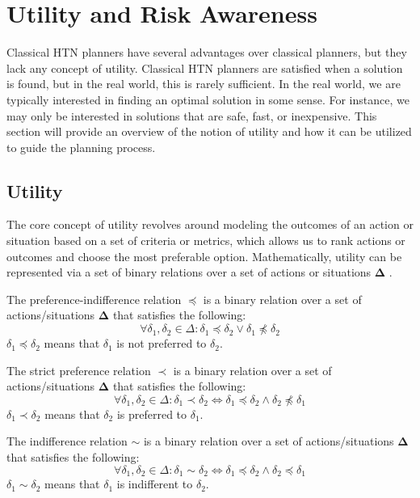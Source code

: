 \section{Utility and Risk Awareness}
\label{sec:utilityAnRisk}

Classical HTN planners have several advantages over classical planners, but they lack any concept of utility. Classical HTN planners are satisfied when a solution is found, but in the real world, this is rarely sufficient. In the real world, we are typically interested in finding an optimal solution in some sense. For instance, we may only be interested in solutions that are safe, fast, or inexpensive. This section will provide an overview of the notion of utility and how it can be utilized to guide the planning process.

\subsection{Utility}
The core concept of utility revolves around modeling the outcomes of an action or situation based on a set of criteria or metrics, which allows us to rank actions or outcomes and choose the most preferable option. Mathematically, utility can be represented via a set of binary relations over a set of actions or situations $\mathbf{\Delta}$ \cite{fishburn1968utility}.

\begin{Tdef}
    The preference-indifference relation $\preceq$ is a binary relation over a set of actions/situations $\mathbf{\Delta}$ that satisfies the following:
    $$\forall \delta_1, \delta_2 \in \Delta : \delta_1 \preceq \delta_2 \vee \delta_1 \npreceq \delta_2$$
    $\delta_1 \preceq \delta_2$ means that $\delta_1$ is not preferred to $\delta_2$.
\end{Tdef}

\begin{Tdef}
    The strict preference relation $\prec$ is a binary relation over a set of actions/situations $\mathbf{\Delta}$ that satisfies the following:
    $$\forall \delta_1, \delta_2 \in \Delta : \delta_1 \prec \delta_2 \Longleftrightarrow \delta_1 \preceq \delta_2 \wedge \delta_2 \npreceq \delta_1$$
    $\delta_1 \prec \delta_2$ means that $\delta_2$ is preferred to $\delta_1$.
\end{Tdef}


\begin{Tdef}
    The indifference relation $\sim$ is a binary relation over a set of actions/situations $\mathbf{\Delta}$ that satisfies the following:
    $$\forall \delta_1, \delta_2 \in \Delta : \delta_1 \sim \delta_2 \Longleftrightarrow \delta_1 \preceq \delta_2 \wedge \delta_2 \preceq \delta_1$$
    $\delta_1 \sim \delta_2$ means that $\delta_1$ is indifferent to $\delta_2$.
\end{Tdef}

